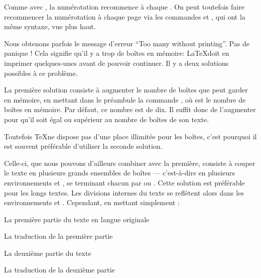 \begin{attention}
Comme avec , la numérotation recommence à chaque . On peut toutefois faire recommencer la numérotation  à chaque page via les commandes  et , qui ont la même syntaxe, vue plus haut.
\end{attention}

Nous obtenons parfois le message d'erreur \enquote{Too many  without printing}. Pas de panique ! Cela signifie qu'il y a trop de boîtes en mémoire: \LaTeX  doit en imprimer quelques-unes avant de pouvoir continuer.  Il y a deux solutions possibles à ce problème.

La première solution consiste à  augmenter le nombre de boîtes que  peut garder en mémoire, en mettant dans le préambule la commande , où  est le nombre de boîtes en mémoire. Par défaut, ce nombre est de dix. Il suffit donc de l'augmenter  pour qu'il soit égal ou supérieur au nombre de boîtes de son  texte. 

Toutefois \TeX ne dispose pas d'une place illimitée pour les boîtes, c'est pourquoi il est souvent préférable d'utiliser la seconde solution.


Celle-ci, que nous pouvons d'ailleurs combiner avec la première, consiste à  couper le texte en plusieurs grands ensembles de boîtes --- c'est-à-dire en plusieurs environnements  et , se terminant chacun par  ou .  Cette solution est préférable pour les longs textes. Les divisions internes du texte se reflètent alors dans les environnements  et . Cependant,  en mettant simplement :

\begin{latexcode}
\begin{pages}  
\begin{Leftside}  \beginnumbering 
La première partie du texte en langue originale
\endnumbering  \end{Leftside} 
 
\begin{Rightside} \beginnumbering
La traduction de la première partie
\endnumbering \end{Rightside} 
 \Pages
 
\begin{Leftside} \beginnumbering  
La deuxième partie du texte 
\endnumbering  \end{Leftside} 
 
\begin{Rightside}  \beginnumbering
La traduction de la deuxième partie
\endnumbering \end{Rightside} 
 \Pages

  \end{pages}
\end{latexcode}

